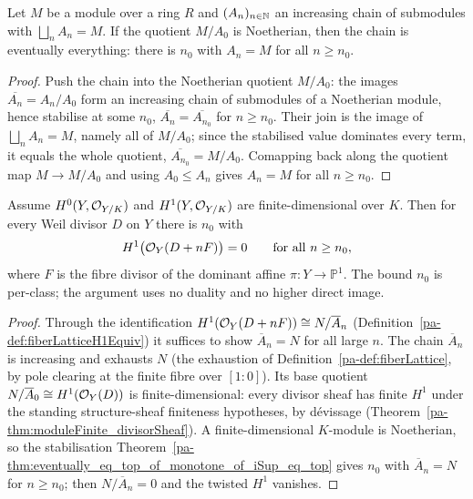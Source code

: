 \begin{theorem}
  \label{pa-thm:eventually_eq_top_of_monotone_of_iSup_eq_top}
  \leanok

  Let \(M\) be a module over a ring \(R\) and \((A_n)_{n \in \mathbb{N}}\) an increasing chain of submodules
  with \(\bigsqcup_n A_n = M\). If the quotient \(M / A_0\) is Noetherian, then the chain is
  eventually everything: there is \(n_0\) with \(A_n = M\) for all \(n \ge n_0\).
\end{theorem}
\begin{proof}
  \leanok
  Push the chain into the Noetherian quotient \(M / A_0\): the images \(\overline{A_n} = A_n / A_0\)
  form an increasing chain of submodules of a Noetherian module, hence stabilise at some \(n_0\),
  \(\overline{A_n} = \overline{A_{n_0}}\) for \(n \ge n_0\). Their join is the image of \(\bigsqcup_n
  A_n = M\), namely all of \(M / A_0\); since the stabilised value dominates every term, it equals
  the whole quotient, \(\overline{A_{n_0}} = M / A_0\). Comapping back along the quotient map
  \(M \to M / A_0\) and using \(A_0 \le A_n\) gives \(A_n = M\) for all \(n \ge n_0\).
\end{proof}

\begin{theorem}
  \label{pa-thm:subsingleton_hModule_divisorSheaf_one_of_isDominant_toP1}
  \leanok

  Assume \(H^0(Y, \mathcal{O}_{Y/K})\) and \(H^1(Y, \mathcal{O}_{Y/K})\) are finite-dimensional over \(K\).
  Then for every Weil divisor \(D\) on \(Y\) there is \(n_0\) with
  \[
    H^1\bigl(\mathcal{O}_{Y}(D + nF)\bigr) = 0 \qquad \text{for all } n \ge n_0 ,
  \]
  where \(F\) is the fibre divisor of the dominant affine \(\pi \colon Y \to \mathbb P^1\). The
  bound \(n_0\) is per-class; the argument uses no duality and no higher direct image.
\end{theorem}
\begin{proof}
  \leanok
  Through the identification \(H^1(\mathcal{O}_{Y}(D + nF)) \cong N / \overline A_n\)
  (Definition~\ref{pa-def:fiberLatticeH1Equiv}) it suffices to show \(\overline A_n = N\) for all large
  \(n\). The chain \(\overline A_n\) is increasing and exhausts \(N\) (the exhaustion of
  Definition~\ref{pa-def:fiberLattice}, by pole clearing at the finite fibre over \([1 : 0]\)). Its
  base quotient \(N / \overline A_0 \cong H^1(\mathcal{O}_{Y}(D))\) is finite-dimensional: every divisor
  sheaf has finite \(H^1\) under the standing structure-sheaf finiteness hypotheses, by dévissage
  (Theorem~\ref{pa-thm:moduleFinite_divisorSheaf}). A finite-dimensional \(K\)-module is Noetherian, so
  the stabilisation Theorem~\ref{pa-thm:eventually_eq_top_of_monotone_of_iSup_eq_top} gives \(n_0\) with
  \(\overline A_n = N\) for \(n \ge n_0\); then \(N / \overline A_n = 0\) and the twisted \(H^1\)
  vanishes.
\end{proof}

